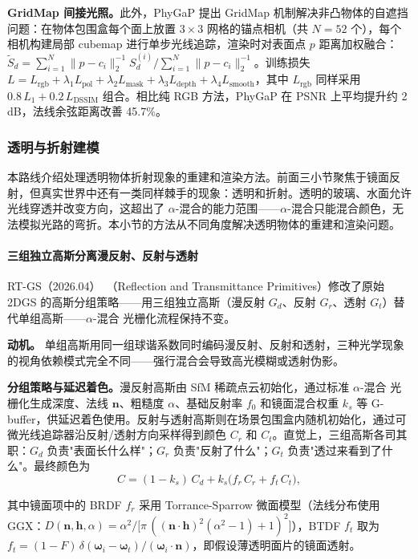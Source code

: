 \textbf{GridMap 间接光照。}此外，PhyGaP 提出 GridMap 机制解决非凸物体的自遮挡问题：在物体包围盒每个面上放置 $3 \times 3$ 网格的锚点相机（共 $N{=}52$ 个），每个相机构建局部 cubemap 进行单步光线追踪，渲染时对表面点 $p$ 距离加权融合：$\tilde{S}_d = \sum_{i=1}^{N} \|p - c_i\|_2^{-1} S_d^{(i)} / \sum_{i=1}^{N} \|p - c_i\|_2^{-1}$。训练损失 $L = L_\text{rgb} + \lambda_1 L_\text{pol} + \lambda_2 L_\text{mask} + \lambda_3 L_\text{depth} + \lambda_4 L_\text{smooth}$，其中 $L_\text{rgb}$ 同样采用 $0.8\,L_1 + 0.2\,L_\text{DSSIM}$ 组合。相比纯 RGB 方法，PhyGaP 在 PSNR 上平均提升约 2\,dB，法线余弦距离改善 45.7\%。

\subsubsection{透明与折射建模}

本路线介绍处理透明物体折射现象的重建和渲染方法。前面三小节聚焦于镜面反射，但真实世界中还有一类同样棘手的现象：透明和折射。透明的玻璃、水面允许光线穿透并改变方向，这超出了 $\alpha$-混合的能力范围——$\alpha$-混合只能混合颜色，无法模拟光路的弯折。本小节的方法从不同角度解决透明物体的重建和渲染问题。

\paragraph{三组独立高斯分离漫反射、反射与透射}

RT-GS（2026.04）~\cite{2604_00509}（Reflection and Transmittance Primitives）修改了原始 2DGS 的高斯分组策略——用三组独立高斯（漫反射 $G_d$、反射 $G_r$、透射 $G_t$）替代单组高斯——$\alpha$-混合 光栅化流程保持不变。

\textbf{动机。} 单组高斯用同一组球谐系数同时编码漫反射、反射和透射，三种光学现象的视角依赖模式完全不同——强行混合会导致高光模糊或透射伪影。

\textbf{分组策略与延迟着色。}漫反射高斯由 SfM 稀疏点云初始化，通过标准 $\alpha$-混合 光栅化生成深度、法线 $\mathbf{n}$、粗糙度 $\alpha$、基础反射率 $f_0$ 和镜面混合权重 $k_s$ 等 G-buffer，供延迟着色使用。反射与透射高斯则在场景包围盒内随机初始化，通过可微光线追踪器沿反射/透射方向采样得到颜色 $C_r$ 和 $C_t$。直觉上，三组高斯各司其职：$G_d$ 负责"表面长什么样"；$G_r$ 负责"反射了什么"；$G_t$ 负责"透过来看到了什么"。最终颜色为
\begin{equation}
C = (1-k_s)\,C_d + k_s\bigl(f_r\,C_r + f_t\,C_t\bigr),
\end{equation}

其中镜面项中的 BRDF $f_r$ 采用 Torrance-Sparrow 微面模型（法线分布使用 GGX：$D(\mathbf{n},\mathbf{h},\alpha)=\alpha^2/\bigl[\pi\,((\mathbf{n}\cdot\mathbf{h})^2(\alpha^2-1)+1)^2\bigr]$），BTDF $f_t$ 取为 $f_t=(1-F)\,\delta(\boldsymbol{\omega}_i-\boldsymbol{\omega}_t)/(\boldsymbol{\omega}_i\cdot\mathbf{n})$，即假设薄透明面片的镜面透射。

